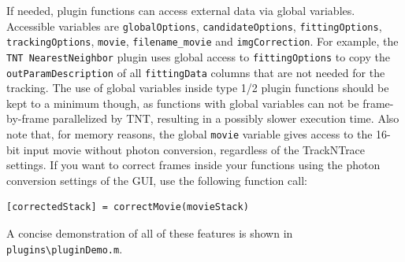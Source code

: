\documentclass[11pt,onside]{report}
\numberwithin{equation}{chapter}
\begin{document}
If needed, plugin functions can access external data via global variables. Accessible variables are \texttt{globalOptions}, \texttt{candidateOptions}, \texttt{fittingOptions}, \texttt{trackingOptions}, \texttt{movie}, \texttt{filename\_movie} and \texttt{imgCorrection}. For example, the \texttt{TNT NearestNeighbor} plugin uses global access to  \texttt{fittingOptions} to copy the \texttt{outParamDescription} of all \texttt{fittingData} columns that are not needed for the tracking. The use of global variables inside type 1/2 plugin functions should be kept to a minimum though, as functions with global variables can not be frame-by-frame parallelized by TNT, resulting in a possibly slower execution time. Also note that, for memory reasons, the global \texttt{movie} variable gives access to the 16-bit input movie without photon conversion, regardless of the TrackNTrace settings. If you want to correct frames inside your functions using the photon conversion settings of the GUI, use the following function call:

\begin{lstlisting}[style=Matlab-editor]
[correctedStack] = correctMovie(movieStack)
\end{lstlisting}

A concise demonstration of all of these features is shown in \texttt{plugins\textbackslash pluginDemo.m}. 

\clearpage
\end{document}
